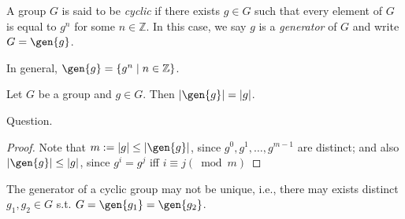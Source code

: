 \begin{definition}[Cyclic]
A group $G$ is said to be 
\emph{cyclic} if there exists $g\in G$ such that every element of $G$ is equal to $g^n$ for some $n\in\mathbb{Z}$. In this case, we say $g$ is a \emph{generator} of $G$ and write $G=\gen{g}$.
\end{definition}
In general, $\gen{g} = \{g^n\mid n\in\mathbb{Z}\}$.
\begin{proposition}\label{Pro:3:6}
Let $G$ be a group and $g\in G$. Then $|\gen{g}| = |g|$.
\end{proposition}
Question.
\begin{proof}
Note that $m:=|g|\le |\gen{g}|$, since $g^0,g^1,\dots,g^{m-1}$ are distinct; and also $|\gen{g}|\le|g|$, since $g^i=g^j$ iff $i\equiv j(\bmod m)$
\end{proof}
\begin{remark}
The generator of a cyclic group may not be unique, i.e., there may exists distinct $g_1,g_2\in G$ s.t. $G=\gen{g_1}=\gen{g_2}$.
\end{remark}
